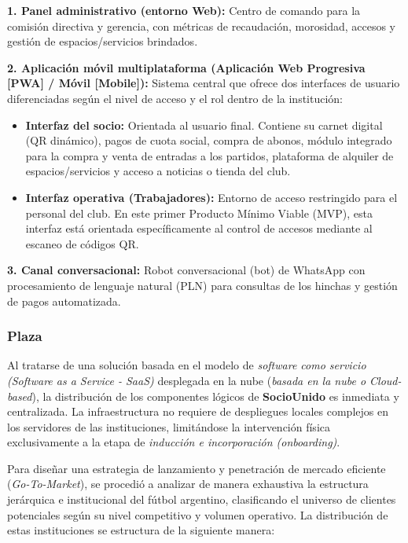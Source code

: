 \textbf{1. Panel administrativo (entorno Web):} Centro de comando para la comisión directiva y gerencia, con métricas de recaudación, morosidad, accesos y gestión de espacios/servicios brindados.

\textbf{2. Aplicación móvil multiplataforma (Aplicación Web Progresiva [PWA] / Móvil [Mobile]):} Sistema central que ofrece dos interfaces de usuario diferenciadas según el nivel de acceso y el rol dentro de la institución:
\begin{itemize}
    \item \textbf{Interfaz del socio:} Orientada al usuario final. Contiene su carnet digital (QR dinámico), pagos de cuota social, compra de abonos, módulo integrado para la compra y venta de entradas a los partidos, plataforma de alquiler de espacios/servicios y acceso a noticias o tienda del club.
    \item \textbf{Interfaz operativa (Trabajadores):} Entorno de acceso restringido para el personal del club. En este primer Producto Mínimo Viable (MVP), esta interfaz está orientada específicamente al control de accesos mediante al escaneo de códigos QR.
\end{itemize}

\textbf{3. Canal conversacional:} Robot conversacional (bot) de WhatsApp con procesamiento de lenguaje natural (PLN) para consultas de los hinchas y gestión de pagos automatizada.

\subsubsection*{Plaza}

Al tratarse de una solución basada en el modelo de \textit{software como servicio (Software as a Service - SaaS)} desplegada en la nube (\textit{basada en la nube o Cloud-based}), la distribución de los componentes lógicos de \textbf{SocioUnido} es inmediata y centralizada. La infraestructura no requiere de despliegues locales complejos en los servidores de las instituciones, limitándose la intervención física exclusivamente a la etapa de \textit{inducción e incorporación (onboarding)}.

Para diseñar una estrategia de lanzamiento y penetración de mercado eficiente (\textit{Go-To-Market}), se procedió a analizar de manera exhaustiva la estructura jerárquica e institucional del fútbol argentino, clasificando el universo de clientes potenciales según su nivel competitivo y volumen operativo. La distribución de estas instituciones se estructura de la siguiente manera:

